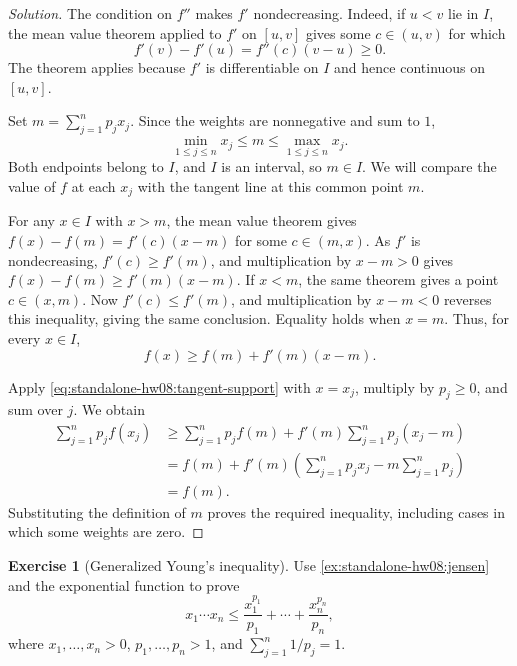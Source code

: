 \documentclass[11pt,letterpaper]{article}
\theoremstyle{definition}
\newtheorem{exercise}{Exercise}
\begin{document}
\begin{proof}[Solution]
  The condition on $f''$ makes $f'$ nondecreasing. Indeed, if $u<v$
  lie in $I$, the mean value theorem applied to $f'$ on $[u,v]$ gives
  some $c\in(u,v)$ for which
  \[
    f'(v)-f'(u)=f''(c)(v-u)\ge0.
  \]
  The theorem applies because $f'$ is differentiable on $I$ and hence
  continuous on $[u,v]$.

  Set $m=\sum_{j=1}^{n}p_jx_j$. Since the weights are nonnegative and
  sum to $1$,
  \[
    \min_{1\le j\le n}x_j\le m\le\max_{1\le j\le n}x_j.
  \]
  Both endpoints belong to $I$, and $I$ is an interval, so $m\in I$.
  We will compare the value of $f$ at each $x_j$ with the tangent line
  at this common point $m$.

  For any $x\in I$ with $x>m$, the mean value theorem gives
  $f(x)-f(m)=f'(c)(x-m)$ for some $c\in(m,x)$. As $f'$ is
  nondecreasing, $f'(c)\ge f'(m)$, and multiplication by $x-m>0$
  gives $f(x)-f(m)\ge f'(m)(x-m)$. If $x<m$, the same theorem gives
  a point $c\in(x,m)$. Now $f'(c)\le f'(m)$, and multiplication by
  $x-m<0$ reverses this inequality, giving the same conclusion.
  Equality holds when $x=m$. Thus, for every $x\in I$,
  \begin{equation}
    f(x)\ge f(m)+f'(m)(x-m).
    \label{eq:standalone-hw08:tangent-support}
  \end{equation}

  Apply \autoref{eq:standalone-hw08:tangent-support} with $x=x_j$,
  multiply by $p_j\ge0$, and sum over $j$. We obtain
  \[
    \begin{aligned}
      \sum_{j=1}^{n}p_jf(x_j)
        &\ge\sum_{j=1}^{n}p_jf(m)
          +f'(m)\sum_{j=1}^{n}p_j(x_j-m)\\
        &=f(m)+f'(m)\left(\sum_{j=1}^{n}p_jx_j
          -m\sum_{j=1}^{n}p_j\right)\\
        &=f(m).
    \end{aligned}
  \]
  Substituting the definition of $m$ proves the required inequality,
  including cases in which some weights are zero.
\end{proof}

\begin{exercise}[Generalized Young's inequality]
  \label{ex:standalone-hw08:young}
  Use \autoref{ex:standalone-hw08:jensen} and the exponential function
  to prove
  \[
    x_1\cdots x_n
      \le\frac{x_1^{p_1}}{p_1}+\cdots+\frac{x_n^{p_n}}{p_n},
  \]
  where $x_1,\ldots,x_n>0$, $p_1,\ldots,p_n>1$, and
  $\sum_{j=1}^{n}1/p_j=1$.
\end{exercise}
\end{document}
